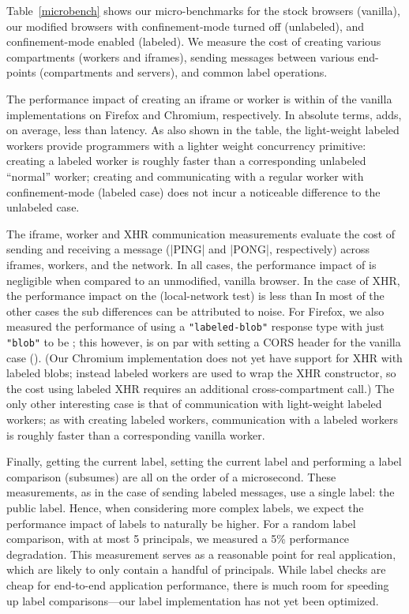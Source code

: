 Table~\ref{microbench} shows our micro-benchmarks for the stock
browsers (vanilla), our modified browsers with confinement-mode turned
off (unlabeled), and confinement-mode enabled (labeled).
%
We measure the cost of creating various compartments (workers and
iframes), sending messages between various end-points
(compartments and servers), and common label operations.

The performance impact of creating an iframe or worker is within
 of the vanilla implementations on Firefox and
Chromium, respectively.
%
In absolute terms, \sys{} adds, on average, less than  latency.
%
As also shown in the table, the \sys{} light-weight labeled workers
provide programmers with a lighter weight concurrency primitive:
creating a labeled worker is roughly  faster than
a corresponding unlabeled ``normal'' worker; creating and
communicating with a regular worker with confinement-mode (labeled
case) does not incur a noticeable difference to the unlabeled case.

%
The iframe, worker and XHR communication measurements evaluate the cost of
sending and receiving a message (\js|PING| and \js|PONG|,
respectively) across iframes, workers, and the network.
%
In all cases, the performance impact of \sys{} is negligible when
compared to an unmodified, vanilla browser.
%
In the case of XHR, the performance impact on the
(local-network test) is less than 
%
In most of the other cases the sub  differences can be
attributed to noise.
%
For Firefox, we also measured the performance of using a
\verb|"labeled-blob"| response type with just \verb|"blob"| to be
; this however, is on par with setting a CORS header
for the vanilla case ().
%
(Our Chromium implementation does not yet have support for XHR with
labeled blobs; instead labeled workers are used to wrap the XHR
constructor, so the cost using labeled XHR requires an additional
cross-compartment call.)
%
The only other interesting case is that of communication with
light-weight labeled workers; as with creating labeled workers,
communication with a labeled workers is roughly  faster
than a corresponding vanilla worker.


Finally, getting the current label, setting the current label and
performing a label comparison (subsumes) are all on the order of a
microsecond.
%
These measurements, as in the case of sending labeled messages, use
a single label: the public label.
%
Hence, when considering more complex labels, we expect the performance
impact of labels to naturally be higher.
%
For a random label comparison, with at most 5 principals, we
measured a 5\% performance degradation.
%
This measurement serves as a reasonable point for real application,
which are likely to only contain a handful of principals.
%
While label checks are cheap for end-to-end application performance,
there is much room for speeding up label comparisons---our label
implementation has not yet been optimized.


